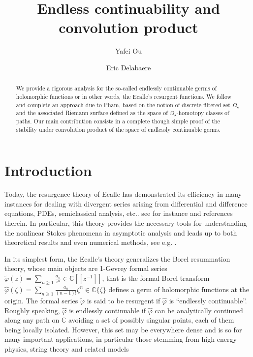 \documentclass[11pt, english]{smfart}
\title[Endless continuability and convolution product]{Endless
  continuability and convolution product}
\author{Yafei Ou}
\author{Eric Delabaere}
\theoremstyle{definition}
\begin{document}
\frontmatter
 
\begin{abstract}
We provide a rigorous analysis for the so-called endlessly continuable
germs of holomorphic functions or in other words, the Ecalle's
resurgent functions. We follow and complete an approach due to 
 Pham,  based on the notion of discrete
filtered set $\Omega_\star$  and the associated Riemann surface defined
as the space of $\Omega_\star$-homotopy classes of paths. Our main
contribution consists in a complete though simple proof of the stability under
convolution product of the space of endlessly continuable germs.
\end{abstract}



 
\maketitle
\tableofcontents 

\mainmatter
 
\section{Introduction}\label{chapt5}

Today, the resurgence theory of Ecalle has demonstrated its
efficiency in many instances for dealing with divergent series arising from differential
and difference equations, PDEs, semiclassical analysis,
etc.. see for instance \cite{Ec84, DP99, Kawai-96, Kawai-004, Cost009,
  Del014, S014} and references
therein. In particular, this theory provides the necessary tools for
understanding the nonlinear Stokes phenomena in asymptotic analysis
and leads up to both theoretical results and even numerical methods,
see e.g. \cite{DH002}.

In its simplest form, the Ecalle's theory  generalizes the Borel
resummation theory, whose main objects are 1-Gevrey formal series
$\displaystyle \widetilde{\varphi}(z) = \sum_{n \geq 1} \frac{a_n}{z^n} \in
\mathbb{C}[[z^{-1}]]$, that is the formal Borel transform $\displaystyle  
\widehat{\varphi}(\zeta)=\sum_{n \geq 1} \frac{a_n}{(n-1)!} \zeta^n \in
\mathbb{C}\{\zeta\}$ defines a germ of holomorphic functions at
the origin. The formal series $\widetilde{\varphi}$ is said to be
resurgent if $\widehat{\varphi}$  is ``endlessly continuable''. 
Roughly speaking, $\widehat{\varphi}$ 
is endlessly continuable if $\widehat{\varphi}$  can be  analytically continued
along any path on $\mathbb{C}$  avoiding a set of possibly singular
points, each of them being locally isolated.
However, this set may be everywhere dense and is so for many important
applications, in particular those stemming from high energy physics,
string theory and related models \cite{DDP93, DDP97, Aniceto012,
  Marino009, Dunne014}
\end{document}
